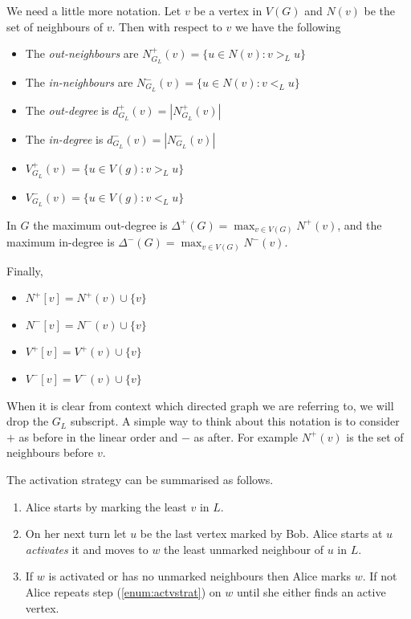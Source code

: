 We need a little more notation. Let $v$ be a vertex in $V(G)$ and $N(v)$ be the set of neighbours of $v$. Then with respect to $v$ we have the following
\begin{itemize}        
    \item The \textit{out-neighbours} are $N^+_{G_L}(v)=\{u\in N(v):v>_L u\}$ 
    \item The \textit{in-neighbours} are $N^-_{G_L}(v)=\{u\in N(v):v<_L u\}$ 
    \item The \textit{out-degree} is $d^+_{G_L}(v)=|N^+_{G_L}(v)|$ 
    \item The \textit{in-degree} is $d^-_{G_L}(v)=|N^-_{G_L}(v)|$
    \item $V^+_{G_L}(v)=\{u\in V(g):v>_L u\}$     
    \item $V^-_{G_L}(v)=\{u\in V(g):v<_L u\}$ 
\end{itemize}

In $G$ the maximum out-degree is $\Delta^+(G)=\max_{v\in V(G)}N^+(v)$, and 
the maximum in-degree is $\Delta^-(G)=\max_{v\in V(G)}N^-(v)$. 

Finally,
\begin{itemize}  
    \item $N^+[v]=N^+(v)\cup\{v\}$
    \item $N^-[v]=N^-(v)\cup\{v\}$
    \item $V^+[v]=V^+(v)\cup\{v\}$
    \item $V^-[v]=V^-(v)\cup\{v\}$
\end{itemize}
When it is clear from context which directed graph we are referring to, we will drop the $G_L$ subscript.  A simple way to think about this notation is to consider $+$ as before in the linear order and $-$ as after. For example $N^+(v)$ is the set of neighbours before $v$.

The activation strategy can be summarised as follows. 
\begin{enumerate}
    \item Alice starts by marking the least $v$ in $L$.
    \item On her next turn let $u$ be the last vertex marked by Bob. Alice starts at $u$ \textit{activates} it and moves to $w$ the least unmarked neighbour of $u$ in $L$. \label{enum:actvstrat}
    \item If $w$ is activated or has no unmarked neighbours then Alice marks $w$. If not Alice repeats step (\ref{enum:actvstrat}) on $w$ until she either finds an active vertex.
\end{enumerate}

